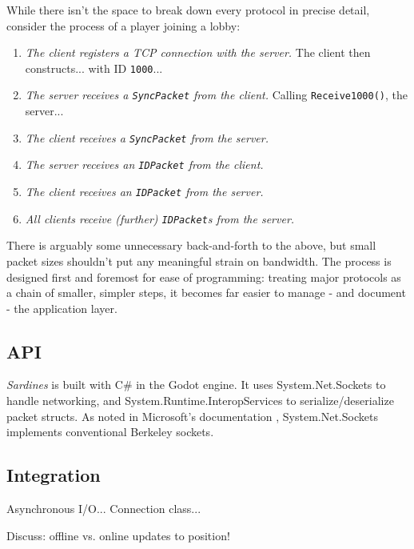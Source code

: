 \documentclass[a4paper, 10pt]{article}
\begin{document}
\begin{flushleft}
\vspace{5pt}\noindent
While there isn't the space to break down every protocol in precise detail, consider the process of a player joining a lobby:
\begin{enumerate}[label=\textit{\arabic*}\textit{.}, noitemsep]
\item \textit{The client registers a TCP connection with the server.} The client then constructs... with ID \texttt{1000}...
\item \textit{The server receives a \texttt{SyncPacket} from the client.} Calling \texttt{Receive1000()}, the server...
\item \textit{The client receives a \texttt{SyncPacket} from the server.}
\item \textit{The server receives an \texttt{IDPacket} from the client.}
\item \textit{The client receives an \texttt{IDPacket} from the server.}
\item \textit{All clients receive (further) \texttt{IDPacket}s from the server.}
\end{enumerate}
There is arguably some unnecessary back-and-forth to the above, but small packet sizes shouldn't put any meaningful strain on bandwidth. The process is designed first and foremost for ease of programming: treating major protocols as a chain of smaller, simpler steps, it becomes far easier to manage - and document - the application layer. 


\subsection*{API}

\textit{Sardines} is built with C\# in the Godot engine. It uses System.Net.Sockets to handle networking, and System.Runtime.InteropServices to serialize/deserialize packet structs. As noted in Microsoft's documentation \citeyearpar{msftSNS}, System.Net.Sockets implements conventional Berkeley sockets.




\subsection*{Integration}

Asynchronous I/O...
Connection class...

\vspace{5pt}\noindent
Discuss: offline vs. online updates to position!


\end{flushleft}
\end{document}
